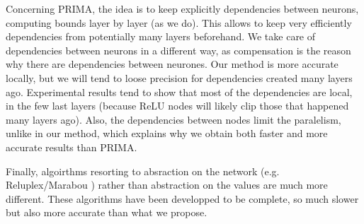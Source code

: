 Concerning PRIMA, the idea is to keep explicitly dependencies between neurons, computing bounds layer by layer (as we do). This allows to keep very efficiently dependencies from potentially many layers beforehand. We take care of dependencies between neurons in a different way, as compensation is the reason why there are dependencies between neurones. 
Our method is more accurate locally, but we will tend to loose precision for  dependencies created many layers ago. Experimental results tend to show that most of the dependencies are local, in the few last layers (because ReLU nodes will likely clip those that happened many layers ago). Also, the dependencies between nodes limit the paralelism, unlike in our method, which explains why we obtain both faster and more accurate results than PRIMA.

Finally, algoirthms resorting to absraction on the network (e.g. Reluplex/Marabou \cite{Reluplex,Marabou}) rather than abstraction on the values are much more different. These algorithms have been developped to be complete, so much slower but also more accurate than what we propose.
